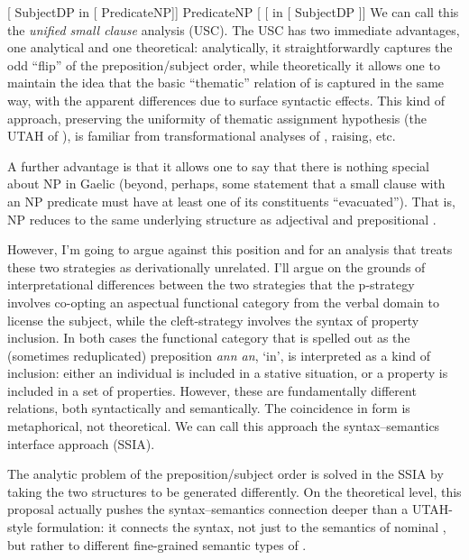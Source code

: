 \documentclass[output=paper]{langsci/langscibook}
\begin{document}
\ea
    \ea {}[ SubjectDP in [  PredicateNP]]
    \ex PredicateNP [ [ in [ SubjectDP ]]
    \z
\z
We can call this the \textit{unified small clause} analysis (USC). The USC has two
immediate advantages, one analytical and one theoretical: analytically, it
straightforwardly captures the odd ``flip'' of the preposition\slash subject order,
while theoretically it allows one to maintain the idea that the basic
``thematic'' relation of  is captured in the same way, with
the apparent differences due to surface syntactic effects. This kind of
approach, preserving the uniformity of thematic assignment hypothesis (the UTAH
of \citealt{baker88}), is familiar from transformational analyses of ,
raising, etc.

A further advantage is that it allows one to say that there is nothing special
about NP  in Gaelic (beyond, perhaps, some statement that a small
clause with an NP predicate must have at least one of its constituents
``evacuated''). That is, NP  reduces to the same underlying structure
as adjectival and prepositional .

However, I'm going to argue against this position and for an analysis that
treats these two strategies as derivationally unrelated. I'll argue on the
grounds of interpretational differences between the two strategies that the
p-strategy involves co-opting an aspectual functional category from the verbal
domain to license the subject, while the cleft-strategy involves the syntax of
property inclusion. In both cases the functional category that is spelled out
as the (sometimes reduplicated) preposition \emph{ann an}, `in', is interpreted
as a kind of inclusion: either an individual is included in a stative
situation, or a property is included in a set of properties. However, these are
fundamentally different relations, both syntactically and semantically. The
coincidence in form is metaphorical, not theoretical. We can call this approach
the syntax--semantics interface approach (SSIA).

The analytic problem of the preposition/subject order is solved in the SSIA by
taking the two structures to be generated differently. On the theoretical
level, this proposal actually pushes the syntax--semantics connection deeper
than a UTAH-style formulation: it connects the syntax, not just to the
semantics of nominal , but rather to different fine-grained semantic
types of .
\end{document}
